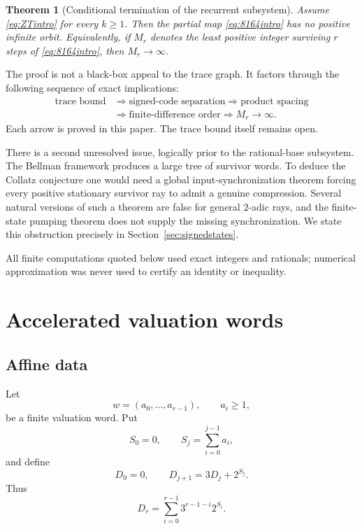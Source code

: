 \documentclass[11pt,reqno]{amsart}
\numberwithin{equation}{section}
\newtheorem{theorem}{Theorem}[section]
\theoremstyle{definition}
\theoremstyle{remark}
\begin{document}
\begin{theorem}[Conditional termination of the recurrent subsystem]\label{thm:intro-chain}
Assume \eqref{eq:ZTintro} for every $k\ge1$.  Then the partial map \eqref{eq:8164intro} has no positive infinite orbit.  Equivalently, if $M_r$ denotes the least positive integer surviving $r$ steps of \eqref{eq:8164intro}, then $M_r\to\infty$.
\end{theorem}

The proof is not a black-box appeal to the trace graph.  It factors through the following sequence of exact implications:
\begin{align*}
\text{trace bound}
&\Longrightarrow \text{signed-code separation}
\Longrightarrow \text{product spacing}\\
&\Longrightarrow \text{finite-difference order}
\Longrightarrow M_r\to\infty.
\end{align*}
Each arrow is proved in this paper.  The trace bound itself remains open.

There is a second unresolved issue, logically prior to the rational-base subsystem.  The Bellman framework produces a large tree of survivor words.  To deduce the Collatz conjecture one would need a global input-synchronization theorem forcing every positive stationary survivor ray to admit a genuine compression.  Several natural versions of such a theorem are false for general $2$-adic rays, and the finite-state pumping theorem does not supply the missing synchronization.  We state this obstruction precisely in Section~\ref{sec:signedstates}.

All finite computations quoted below used exact integers and rationals; numerical approximation was never used to certify an identity or inequality.

\section{Accelerated valuation words}\label{sec:words}

\subsection{Affine data}

Let
\[
 w=(a_0,\ldots,a_{r-1}),\qquad a_i\ge1,
\]
be a finite valuation word.  Put
\[
 S_0=0,\qquad S_j=\sum_{i=0}^{j-1}a_i,
\]
and define
\begin{equation}\label{eq:Drec}
 D_0=0,
 \qquad
 D_{j+1}=3D_j+2^{S_j}.
\end{equation}
Thus
\begin{equation}\label{eq:Dsum}
 D_r=\sum_{i=0}^{r-1}3^{r-1-i}2^{S_i}.
\end{equation}
\end{document}
